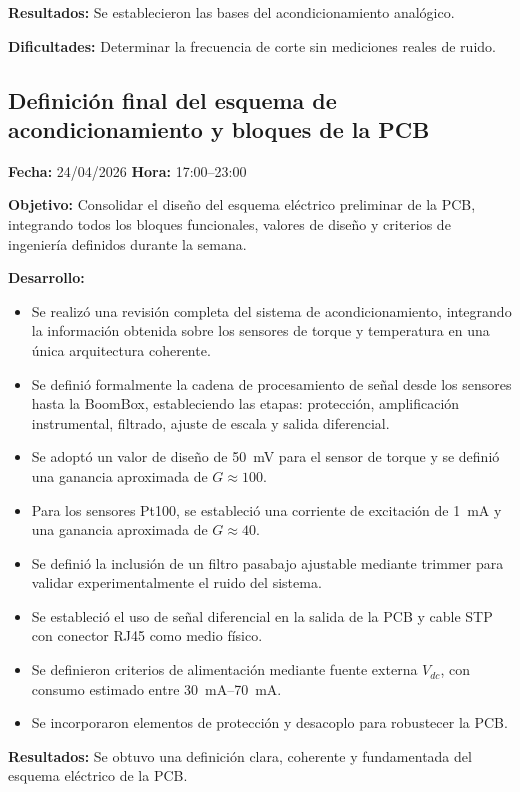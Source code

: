 \documentclass[12pt]{article}
\begin{document}
\textbf{Resultados:}
Se establecieron las bases del acondicionamiento analógico.

\textbf{Dificultades:}
Determinar la frecuencia de corte sin mediciones reales de ruido.

\subsection{Definición final del esquema de acondicionamiento y bloques de la PCB}
\textbf{Fecha:} 24/04/2026 \quad \textbf{Hora:} 17:00--23:00

\textbf{Objetivo:}
Consolidar el diseño del esquema eléctrico preliminar de la PCB, integrando todos los bloques funcionales, valores de diseño y criterios de ingeniería definidos durante la semana.

\textbf{Desarrollo:}
\begin{itemize}
\item Se realizó una revisión completa del sistema de acondicionamiento, integrando la información obtenida sobre los sensores de torque y temperatura en una única arquitectura coherente.
\item Se definió formalmente la cadena de procesamiento de señal desde los sensores hasta la BoomBox, estableciendo las etapas: protección, amplificación instrumental, filtrado, ajuste de escala y salida diferencial.
\item Se adoptó un valor de diseño de \SI{50}{mV} para el sensor de torque y se definió una ganancia aproximada de \(G \approx 100\).
\item Para los sensores Pt100, se estableció una corriente de excitación de \SI{1}{mA} y una ganancia aproximada de \(G \approx 40\).
\item Se definió la inclusión de un filtro pasabajo ajustable mediante trimmer para validar experimentalmente el ruido del sistema.
\item Se estableció el uso de señal diferencial en la salida de la PCB y cable STP con conector RJ45 como medio físico.
\item Se definieron criterios de alimentación mediante fuente externa \(V_{dc}\), con consumo estimado entre \SIrange{30}{70}{mA}.
\item Se incorporaron elementos de protección y desacoplo para robustecer la PCB.
\end{itemize}

\textbf{Resultados:}
Se obtuvo una definición clara, coherente y fundamentada del esquema eléctrico de la PCB.
\end{document}
